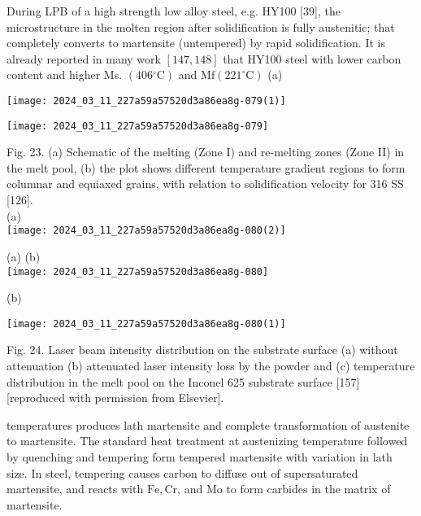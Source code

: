 \documentclass[10pt]{article}
\begin{document}
During LPB of a high strength low alloy steel, e.g. HY100 [39], the microstructure in the molten region after solidification is fully austenitic; that completely converts to martensite (untempered) by rapid solidification. It is already reported in many work $[147,148]$ that HY100 steel with lower carbon content and higher Ms. $\left(406{ }^{\circ} \mathrm{C}\right)$ and $\mathrm{Mf}\left(221^{\circ} \mathrm{C}\right)$ (a)

\begin{center}
\texttt{[image: 2024\_03\_11\_227a59a57520d3a86ea8g-079(1)]}
\end{center}

\begin{center}
\texttt{[image: 2024\_03\_11\_227a59a57520d3a86ea8g-079]}
\end{center}

Fig. 23. (a) Schematic of the melting (Zone I) and re-melting zones (Zone II) in the melt pool, (b) the plot shows different temperature gradient regions to form columnar and equiaxed grains, with relation to solidification velocity for 316 SS [126].\\
(a)\\
\texttt{[image: 2024\_03\_11\_227a59a57520d3a86ea8g-080(2)]}

(a) (b)\\
\texttt{[image: 2024\_03\_11\_227a59a57520d3a86ea8g-080]}

(b)

\begin{center}
\texttt{[image: 2024\_03\_11\_227a59a57520d3a86ea8g-080(1)]}
\end{center}

Fig. 24. Laser beam intensity distribution on the substrate surface (a) without attenuation (b) attenuated laser intensity loss by the powder and (c) temperature distribution in the melt pool on the Inconel 625 substrate surface [157] [reproduced with permission from Elsevier].

temperatures produces lath martensite and complete transformation of austenite to martensite. The standard heat treatment at austenizing temperature followed by quenching and tempering form tempered martensite with variation in lath size. In steel, tempering causes carbon to diffuse out of supersaturated martensite, and reacts with $\mathrm{Fe}, \mathrm{Cr}$, and Mo to form carbides in the matrix of martensite.
\end{document}
